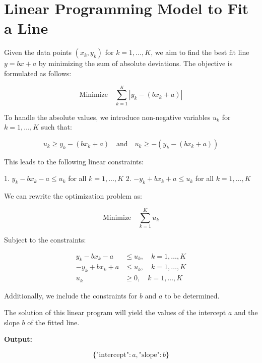 \documentclass{article}
\begin{document}
\section*{Linear Programming Model to Fit a Line}

Given the data points \((x_k, y_k)\) for \(k = 1, \ldots, K\), we aim to find the best fit line \(y = bx + a\) by minimizing the sum of absolute deviations. The objective is formulated as follows:

\[
\text{Minimize} \quad \sum_{k=1}^{K} |y_k - (bx_k + a)|
\]

To handle the absolute values, we introduce non-negative variables \(u_k\) for \(k = 1, \ldots, K\) such that:

\[
u_k \geq y_k - (bx_k + a) \quad \text{and} \quad u_k \geq -(y_k - (bx_k + a))
\]

This leads to the following linear constraints:

1. \( y_k - bx_k - a \leq u_k \) for all \( k = 1, \ldots, K \)
2. \( -y_k + bx_k + a \leq u_k \) for all \( k = 1, \ldots, K \)

We can rewrite the optimization problem as:

\[
\text{Minimize} \quad \sum_{k=1}^{K} u_k
\]

Subject to the constraints:

\[
\begin{align*}
y_k - bx_k - a & \leq u_k, \quad k = 1, \ldots, K \\
-y_k + bx_k + a & \leq u_k, \quad k = 1, \ldots, K \\
u_k & \geq 0, \quad k = 1, \ldots, K
\end{align*}
\]

Additionally, we include the constraints for \(b\) and \(a\) to be determined.

The solution of this linear program will yield the values of the intercept \(a\) and the slope \(b\) of the fitted line.

\textbf{Output:}

\[
\{
\text{"intercept"}: a,
\text{"slope"}: b
\}
\]
\end{document}
